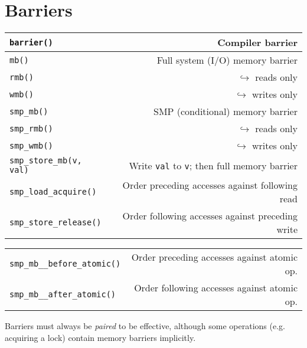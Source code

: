 %

\section{Barriers}

\begin{header}

\begin{tabularx}{\linewidth}{@{}lR@{}}
\texttt{barrier()} & Compiler barrier \\
\hline
\texttt{mb()} & Full system (I/O) memory barrier \\
\texttt{rmb()} & $\hookrightarrow$ reads only \\
\texttt{wmb()} & $\hookrightarrow$ writes only \\
\hline
\texttt{smp\_mb()} & SMP (conditional) memory barrier \\
\texttt{smp\_rmb()} & $\hookrightarrow$ reads only \\
\texttt{smp\_wmb()} & $\hookrightarrow$ writes only \\
\hline
\texttt{smp\_store\_mb(v, val)} & Write \texttt{val} to \texttt{v}; then full memory barrier \\
\texttt{smp\_load\_acquire()} & Order preceding accesses against following read \\
\texttt{smp\_store\_release()} & Order following accesses against preceding write \\
\hline
\end{tabularx}
\begin{tabularx}{\linewidth}{@{}lR@{}}
\texttt{smp\_mb\_\_before\_atomic()} & Order preceding accesses against atomic op. \\
\texttt{smp\_mb\_\_after\_atomic()} & Order following accesses against atomic op. \\
\end{tabularx}

Barriers must always be \emph{paired} to be effective, although some operations (e.g. acquiring a lock) contain memory barriers implicitly.
\end{header}
